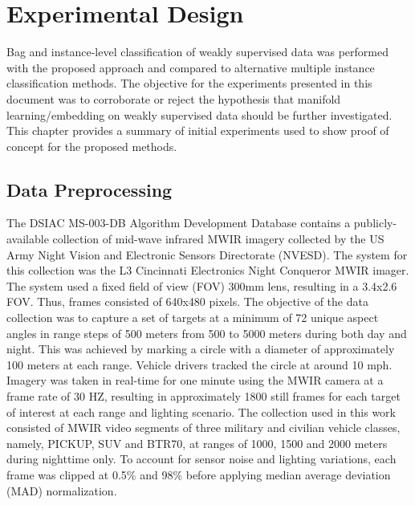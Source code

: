 \chapter{Experimental Design}
Bag and instance-level classification of weakly supervised data was performed with the proposed approach and compared to alternative multiple instance classification methods.  The objective for the experiments presented in this document was to corroborate or reject the hypothesis that manifold learning/embedding on weakly supervised data should be further investigated.  This chapter provides a summary of initial experiments used to show proof of concept for the proposed methods. 


\section{Data Preprocessing}
The DSIAC MS-003-DB Algorithm Development Database \citep{DSIACATR} contains a publicly-available collection of mid-wave infrared MWIR imagery collected by the US Army Night Vision and Electronic Sensors Directorate (NVESD). The system for this collection was the L3 Cincinnati Electronics Night Conqueror MWIR imager. The system used a fixed field of view (FOV) 300mm lens, resulting in a 3.4x2.6 FOV.  Thus, frames consisted of 640x480 pixels.  The objective of the data collection was to capture a set of targets at a minimum of 72 unique aspect angles in range steps of 500 meters from 500 to 5000 meters during both day and night.  This was achieved by marking a circle with a diameter of approximately 100 meters at each range.  Vehicle drivers tracked the circle at around 10 mph. Imagery was taken in real-time for one minute using the  MWIR camera at a frame rate of 30 HZ, resulting in approximately 1800 still frames for each target of interest at each range and lighting scenario.  The collection used in this work consisted of MWIR video segments of three military and civilian vehicle classes, namely, PICKUP, SUV and BTR70, at ranges of 1000, 1500 and 2000 meters during nighttime only.  To account for sensor noise and lighting variations,  each frame was clipped at 0.5\% and 98\% before applying median average deviation (MAD) normalization.
 
